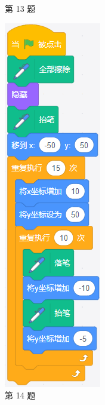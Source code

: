 \documentclass[10pt, a4paper]{article}
\begin{document}
\begin{enumerate}
\begin{figure}[htbp]
\begin{minipage}[t]{.28\textwidth}
                \caption*{第 13 题}
            \end{minipage}
            \begin{minipage}[t]{.11\textwidth}
                \centering
                \includegraphics[width=\textwidth]{figure/14.png}
                \caption*{第 14 题}
            \end{minipage}
        \end{figure}


\end{enumerate}
\end{document}
